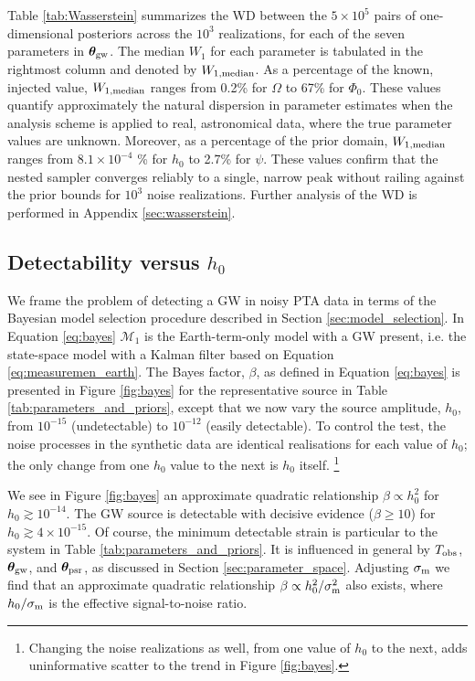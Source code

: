 \documentclass[fleqn,usenatbib,useAMS]{mnras}
\begin{document}
Table \ref{tab:Wasserstein} summarizes the WD between the $5\times 10^5$ pairs of one-dimensional posteriors across the $10^3$ realizations, for each of the seven parameters in ${\boldsymbol{\theta}}_{\rm gw}$. The median $W_1$ for each parameter is tabulated in the rightmost column and denoted by $W_{1,{\rm median}}$. As a percentage of the known, injected value, $W_{\rm 1,median}$ ranges from  0.2\% for $\Omega$ to 67\% for $\Phi_0$. These values quantify approximately the natural dispersion in parameter estimates when the analysis scheme is applied to real, astronomical data, where the true parameter values are unknown. Moreover, as a percentage of the prior domain, $W_{\rm 1,median}$ ranges from $8.1 \times 10^{-4}$ \% for $h_0$ to 2.7\% for $\psi$. These values confirm that the nested sampler converges reliably to a single, narrow peak without railing against the prior bounds for $10^3$ noise realizations. Further analysis of the WD is performed in Appendix \ref{sec:wasserstein}.



\subsection{Detectability versus $h_0$} \label{sec:detection}
We frame the problem of detecting a GW in noisy PTA data in terms of the Bayesian model selection procedure described in Section \ref{sec:model_selection}. In Equation \eqref{eq:bayes} $\mathcal{M}_1$ is the Earth-term-only model with a GW present, i.e. the state-space model with a Kalman filter based on Equation \eqref{eq:measuremen_earth}. The Bayes factor, $\beta$, as defined in Equation \eqref{eq:bayes} is presented in Figure \ref{fig:bayes} for the representative source in Table \ref{tab:parameters_and_priors}, except that we now vary the source amplitude, $h_0$, from $10^{-15}$ (undetectable) to $10^{-12}$ (easily detectable). To control the test, the noise processes in the synthetic data are identical realisations for each value of $h_0$; the only change from one $h_0$ value to the next is $h_0$ itself. \footnote{Changing the noise realizations as well, from one value of $h_0$ to the next, adds uninformative scatter to the trend in Figure \ref{fig:bayes}.} \newline 

	
We see in Figure \ref{fig:bayes} an approximate quadratic relationship $\beta \propto h_0^2$ for $h_0 \gtrsim 10^{-14}$. The GW source is detectable with decisive evidence ($\beta \geq 10$) for $h_0 \gtrsim 4 \times 10^{-15}$. Of course, the minimum detectable strain is particular to the system in Table \ref{tab:parameters_and_priors}. It is influenced in general by $T_{\rm obs}$, ${\boldsymbol{\theta}}_{\rm gw}$, and ${\boldsymbol{\theta}}_{\rm psr}$, as discussed in Section \ref{sec:parameter_space}. Adjusting $\sigma_{\rm m}$ we find that an approximate quadratic relationship $\beta \propto h_0^2 / \sigma_{\rm m}^2$ also exists, where $h_0 / \sigma_{\rm m}$ is the effective signal-to-noise ratio. \newline 
\end{document}
